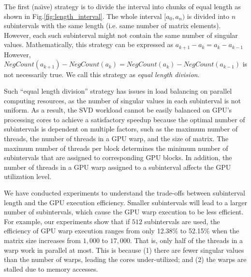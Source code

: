 The first (na\"{\i}ve) strategy is to divide the interval into chunks of equal length as shown in Fig.\ref{fig:length_interval}.
The whole interval $[a_0, a_n)$ is divided into $n$ subintervals with
the same length (i.e. same number of matrix elements). However, each
such  subinterval might not contain the same number of singular values.
Mathematically, this strategy can be expressed as
$a_{k+1}-a_k = a_{k}-a_{k-1}$ %
However,
$NegCount(a_{k+1})-NegCount(a_{k}) = NegCount(a_{k})-NegCount(a_{k-1})$
is not necessarily true. We call this strategy as {\it equal length division}.

%

Such ``equal length division'' strategy has issues in load balancing on 
parallel computing resources, as the number of singular values in each
subinterval is not uniform. As a result,
the SVD workload cannot be easily balanced on GPU's processing cores to achieve a satisfactory speedup because the optimal number of subintervals is dependent on multiple factors, such as the maximum number of threads, the number of threads in a GPU warp, and the size of matrix.
The maximum number of threads per block determines the minimum number
of subintervals that are assigned to corresponding GPU blocks.
In addition, the number of threads in a GPU warp assigned to a subinterval affects the GPU utilization level.

We have conducted experiments to understand the trade-offs %
between subinterval length
and the GPU execution efficiency. Smaller subintervals will lead to a larger number of subintervals, which cause the GPU warp execution to be less efficient. 
For example, our experiments show that if $512$ subintervals are used, the efficiency of GPU warp execution ranges from only 12.38\% to 52.15\% when the matrix size increases from $1,000$ to $17,000$.
That is, only half of the threads in a warp work in parallel at most. This is because  (1)
 there are fewer singular values than the number of warps, leading the cores under-utilized; and 
(2) the warps are stalled due to memory accesses.

